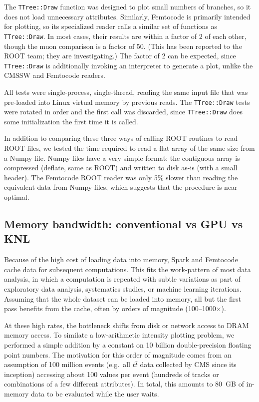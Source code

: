 \documentclass[12pt]{article}
\begin{document}
The {\tt TTree::Draw} function was designed to plot small numbers of branches, so it does not load unnecessary attributes. Similarly, Femtocode is primarily intended for plotting, so its specialized reader calls a similar set of functions as {\tt TTree::Draw}. In most cases, their results are within a factor of 2 of each other, though the muon comparison is a factor of 50. (This has been reported to the ROOT team; they are investigating.) The factor of 2 can be expected, since {\tt TTree::Draw} is additionally invoking an interpreter to generate a plot, unlike the CMSSW and Femtocode readers.

All tests were single-process, single-thread, reading the same input file that was pre-loaded into Linux virtual memory by previous reads. The {\tt TTree::Draw} tests were rotated in order and the first call was discarded, since {\tt TTree::Draw} does some initialization the first time it is called.

In addition to comparing these three ways of calling ROOT routines to read ROOT files, we tested the time required to read a flat array of the same size from a Numpy file. Numpy files have a very simple format: the contiguous array is compressed (deflate, same as ROOT) and written to disk as-is (with a small header). The Femtocode ROOT reader was only 5\% slower than reading the equivalent data from Numpy files, which suggests that the procedure is near optimal.

\subsection*{Memory bandwidth: conventional vs GPU vs KNL}

Because of the high cost of loading data into memory, Spark and Femtocode cache data for subsequent computations. This fits the work-pattern of most data analysis, in which a computation is repeated with subtle variations as part of exploratory data analysis, systematics studies, or machine learning iterations. Assuming that the whole dataset can be loaded into memory, all but the first pass benefits from the cache, often by orders of magnitude (100--1000$\times$).

At these high rates, the bottleneck shifts from disk or network access to DRAM memory access. To similate a low-arithmetic intensity plotting problem, we performed a simple addition by a constant on 10 billion double-precision floating point numbers. The motivation for this order of magnitude comes from an assumption of 100 million events (e.g.\ all $t\bar{t}$ data collected by CMS since its inception) accessing about 100 values per event (hundreds of tracks or combinations of a few different attributes). In total, this amounts to 80~GB of in-memory data to be evaluated while the user waits.
\end{document}
